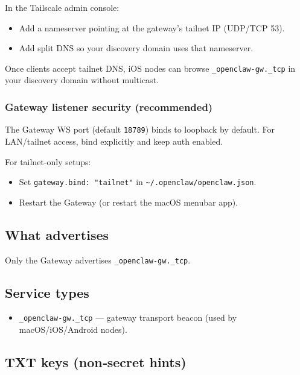 In the Tailscale admin console:

\begin{itemize}
  \item Add a nameserver pointing at the gateway’s tailnet IP (UDP/TCP 53).
  \item Add split DNS so your discovery domain uses that nameserver.
\end{itemize}


Once clients accept tailnet DNS, iOS nodes can browse
\texttt{\_openclaw-gw.\_tcp} in your discovery domain without multicast.

\subsubsection{Gateway listener security (recommended)}


The Gateway WS port (default \texttt{18789}) binds to loopback by default. For LAN/tailnet
access, bind explicitly and keep auth enabled.

For tailnet‑only setups:

\begin{itemize}
  \item Set \texttt{gateway.bind: "tailnet"} in \texttt{\textasciitilde{}/.openclaw/openclaw.json}.
  \item Restart the Gateway (or restart the macOS menubar app).
\end{itemize}


\subsection{What advertises}


Only the Gateway advertises \texttt{\_openclaw-gw.\_tcp}.

\subsection{Service types}


\begin{itemize}
  \item \texttt{\_openclaw-gw.\_tcp} — gateway transport beacon (used by macOS/iOS/Android nodes).
\end{itemize}


\subsection{TXT keys (non‑secret hints)}


